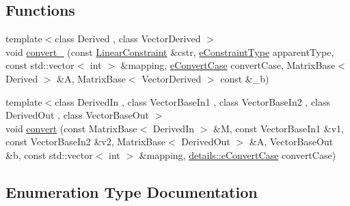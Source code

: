 \subsection*{Functions}
\begin{DoxyCompactItemize}
\item 
{\footnotesize template$<$class Derived , class Vector\+Derived $>$ }\\void \hyperlink{namespaceocra_1_1utils_1_1details_a47a75bc377ce3547c94c54c6d500fffb}{convert\+\_\+} (const \hyperlink{namespaceocra_ae8b87cf4099be3efc3b410019ad2046e}{Linear\+Constraint} \&cstr, \hyperlink{namespaceocra_aedff92662043a7f15dc263363db7939b}{e\+Constraint\+Type} apparent\+Type, const std\+::vector$<$ int $>$ \&mapping, \hyperlink{namespaceocra_1_1utils_1_1details_a617d399055aa54cfdf2d3199ca91c399}{e\+Convert\+Case} convert\+Case, Matrix\+Base$<$ Derived $>$ \&A, Matrix\+Base$<$ Vector\+Derived $>$ const \&\+\_\+b)
\item 
{\footnotesize template$<$class Derived\+In , class Vector\+Base\+In1 , class Vector\+Base\+In2 , class Derived\+Out , class Vector\+Base\+Out $>$ }\\void \hyperlink{namespaceocra_1_1utils_1_1details_a127392d7e9e17996ff887583037da190}{convert} (const Matrix\+Base$<$ Derived\+In $>$ \&M, const Vector\+Base\+In1 \&v1, const Vector\+Base\+In2 \&v2, Matrix\+Base$<$ Derived\+Out $>$ \&A, Vector\+Base\+Out \&b, const std\+::vector$<$ int $>$ \&mapping, \hyperlink{namespaceocra_1_1utils_1_1details_a617d399055aa54cfdf2d3199ca91c399}{details\+::e\+Convert\+Case} convert\+Case)
\end{DoxyCompactItemize}


\subsection{Enumeration Type Documentation}
